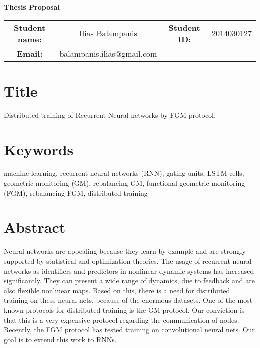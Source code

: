 \documentclass{article}
\begin{document}
    \begin{center}
        \LARGE{\textbf{Thesis Proposal}}\\[.5cm]

        \begin{table}[h!]

            \begin{tabular}{ c c c c }
                \hspace{-1.3cm}
                \textbf{Student name:} & Ilias Balampanis & \textbf{Student ID:} & 2014030127  \\
                \hspace{-1.5cm}
                \textbf{Email:} & balampanis.ilias@gmail.com
            \end{tabular}
        \end{table}

    \end{center}


    \section*{Title}
    Distributed training of Recurrent Neural networks by FGM protocol.

    \section*{Keywords}
    machine learning, recurrent neural networks (RNN), gating units, LSTM cells, geometric monitoring (GM), rebalancing GM, functional geometric monitoring (FGM), rebalancing FGM, distributed training

    \section*{Abstract}
    Neural networks are appealing because they learn by example and are strongly supported by statistical and optimization theories.
    The usage of recurrent neural networks as identifiers and predictors in nonlinear dynamic systems has increased significantly.
    They can present a wide range of dynamics, due to feedback and are also flexible nonlinear maps.
    Based on this, there is a need for distributed training on these neural nets, because of the enormous datasets.
    One of the most known protocols for distributed training is the GM protocol.
    Our conviction is that this is a very expensive protocol regarding the communication of nodes.
    Recently, the FGM protocol has tested training on convolutional neural nets.
    Our goal is to extend this work to RNNs.
\end{document}
